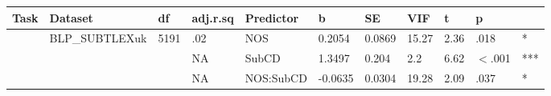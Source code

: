 \begin{table}[ht]
\centering
\begingroup\normalsize
\begin{tabular}{lllllllllll}
  \hline
Task & Dataset & df & adj.r.sq & Predictor & b & SE & VIF & t & p &  \\ 
  \hline
 & BLP\_SUBTLEXuk & 5191 & .02 & NOS & 0.2054 & 0.0869 & 15.27 & 2.36 & .018 & * \\ 
   &  &  & NA & SubCD & 1.3497 & 0.204 & 2.2 & 6.62 & $<$.001 & *** \\ 
   &  &  & NA & NOS:SubCD & -0.0635 & 0.0304 & 19.28 & 2.09 & .037 & * \\ 
   \hline
\end{tabular}
\endgroup
\end{table}
